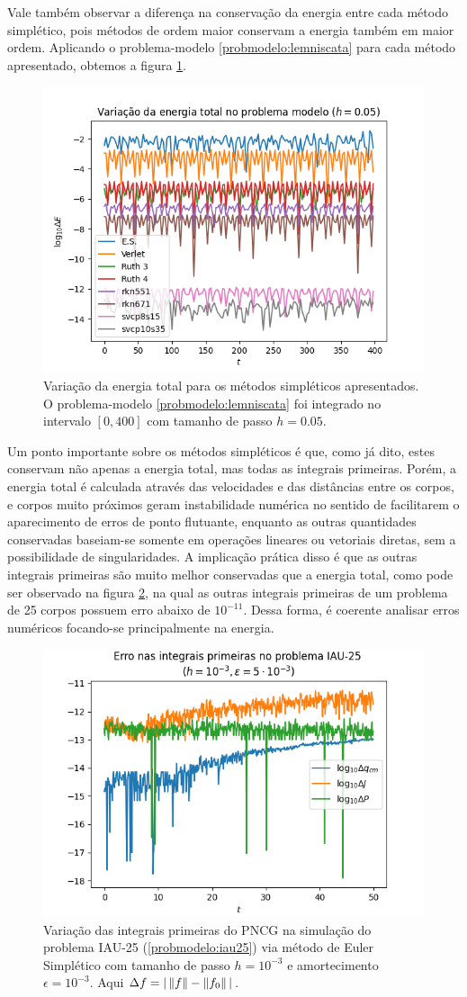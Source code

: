 Vale também observar a diferença na conservação da energia entre cada método simplético, pois métodos de ordem maior conservam a energia também em maior ordem. Aplicando o problema-modelo \ref{probmodelo:lemniscata} para cada método apresentado, obtemos a figura \ref{fig:var_energia_simpleticos}.

\begin{figure}
    \centering
    \includegraphics[width=0.7\linewidth]{tcc//img/var_energia_simpleticos.png}
    \caption{Variação da energia total para os métodos simpléticos apresentados. O problema-modelo \ref{probmodelo:lemniscata} foi integrado no intervalo $[0,400]$ com tamanho de passo $h=0.05$.}
    \label{fig:var_energia_simpleticos}
\end{figure}

Um ponto importante sobre os métodos simpléticos é que, como já dito, estes conservam não apenas a energia total, mas todas as integrais primeiras. Porém, a energia total é calculada através das velocidades e das distâncias entre os corpos, e corpos muito próximos geram instabilidade numérica no sentido de facilitarem o aparecimento de erros de ponto flutuante, enquanto as outras quantidades conservadas baseiam-se somente em operações lineares ou vetoriais diretas, sem a possibilidade de singularidades. A implicação prática disso é que as outras integrais primeiras são muito melhor conservadas que a energia total, como pode ser observado na figura \ref{fig:var_integrais_es_iau25}, na qual as outras integrais primeiras de um problema de 25 corpos possuem erro abaixo de $10^{-11}$. Dessa forma, é coerente analisar erros numéricos focando-se principalmente na energia.

\begin{figure}
    \centering
    \includegraphics[width=0.5\linewidth]{tcc//img/var_integrais_es_iau25.png}
    \caption{Variação das integrais primeiras do PNCG na simulação do problema IAU-25 (\ref{probmodelo:iau25}) via método de Euler Simplético com tamanho de passo $h=10^{-3}$ e amortecimento $\epsilon=10^{-3}$. Aqui $\Delta f = |\left\Vert f \right\Vert - \left\Vert f_0 \right\Vert|$.}
    \label{fig:var_integrais_es_iau25}
\end{figure}